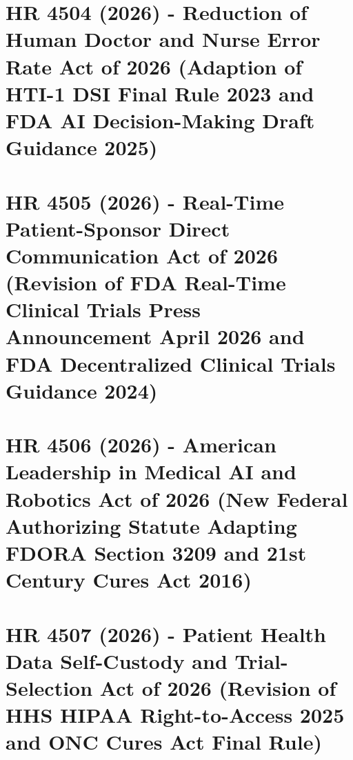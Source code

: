 \documentclass[11pt,letterpaper]{article}
\begin{document}
\section{HR 4504 (2026) - Reduction of Human Doctor and Nurse Error Rate Act of 2026 (Adaption of HTI-1 DSI Final Rule 2023 and FDA AI Decision-Making Draft Guidance 2025)}
\label{sec:hr4504}

\newpage

\section{HR 4505 (2026) - Real-Time Patient-Sponsor Direct Communication Act of 2026 (Revision of FDA Real-Time Clinical Trials Press Announcement April 2026 and FDA Decentralized Clinical Trials Guidance 2024)}
\label{sec:hr4505}

\newpage

\section{HR 4506 (2026) - American Leadership in Medical AI and Robotics Act of 2026 (New Federal Authorizing Statute Adapting FDORA Section 3209 and 21st Century Cures Act 2016)}
\label{sec:hr4506}

\newpage

\section{HR 4507 (2026) - Patient Health Data Self-Custody and Trial-Selection Act of 2026 (Revision of HHS HIPAA Right-to-Access 2025 and ONC Cures Act Final Rule)}
\label{sec:hr4507}

\newpage

\end{document}

